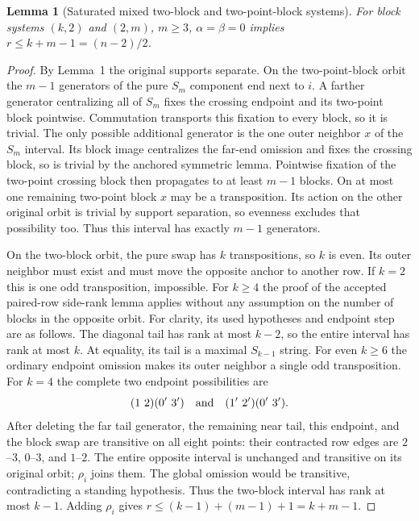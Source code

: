 \documentclass[11pt,a4paper]{article}
\newtheorem{lemma}{Lemma}
\begin{document}
\begin{lemma}[Saturated mixed two-block and two-point-block systems]
For block systems $(k,2)$ and $(2,m)$, $m\geq3$,
$\alpha=\beta=0$ implies $r\leq k+m-1=(n-2)/2$.
\end{lemma}
\begin{proof}
By Lemma~1 the original supports separate. On the two-point-block
orbit the $m-1$ generators of the pure $S_m$ component end
next to $i$. A farther generator centralizing all of $S_m$ fixes
the crossing endpoint and its two-point block pointwise.
Commutation transports this fixation to every block, so it is
trivial. The only possible additional generator is the one
outer neighbor $x$ of the $S_m$ interval. Its block image
centralizes the far-end omission and fixes the crossing block,
so is trivial by the anchored symmetric lemma. Pointwise
fixation of the two-point crossing block then propagates to
at least $m-1$ blocks. On at most one remaining two-point
block $x$ may be a transposition. Its action on the other
original orbit is trivial by support separation, so evenness
excludes that possibility too. Thus this interval has exactly
$m-1$ generators.

On the two-block orbit, the pure swap has $k$ transpositions,
so $k$ is even. Its outer neighbor must exist and must move
the opposite anchor to another row. If $k=2$ this is one
odd transposition, impossible. For $k\geq4$ the proof of the
accepted paired-row side-rank lemma applies without any
assumption on the number of blocks in the opposite orbit.
For clarity, its used hypotheses and endpoint step are as follows.
The diagonal tail has rank at most $k-2$, so the entire interval
has rank at most $k$. At equality, its tail is a maximal
$S_{k-1}$ string. For even $k\geq6$ the ordinary endpoint
omission makes its outer neighbor a single odd transposition.
For $k=4$ the complete two endpoint possibilities are
\[
 (1\ 2)(0'\ 3')\quad\hbox{and}\quad(1'\ 2')(0'\ 3').
\]
After deleting the far tail generator, the remaining near tail,
this endpoint, and the block swap are transitive on all eight
points: their contracted row edges are $2$--$3$, $0$--$3$,
and $1$--$2$. The entire opposite interval is unchanged and
transitive on its original orbit; $\rho_i$ joins them. The
global omission would be transitive, contradicting a standing
hypothesis. Thus the two-block interval has rank at most $k-1$.
Adding $\rho_i$ gives $r\leq(k-1)+(m-1)+1=k+m-1$.
\end{proof}
\end{document}
